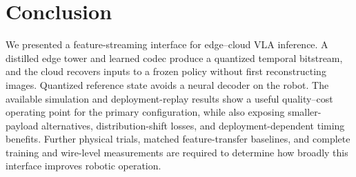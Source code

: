 \section{Conclusion}
\label{sec:conclusion}
We presented a feature-streaming interface for edge--cloud VLA inference.
A distilled edge tower and learned codec produce a quantized temporal
bitstream, and the cloud recovers inputs to a frozen policy without
first reconstructing images. Quantized reference state avoids a neural
decoder on the robot. The available simulation and deployment-replay
results show a useful quality--cost operating point for the primary
configuration, while also exposing smaller-payload alternatives,
distribution-shift losses, and deployment-dependent timing benefits.
Further physical trials, matched feature-transfer baselines, and
complete training and wire-level measurements are required to determine
how broadly this interface improves robotic operation.
